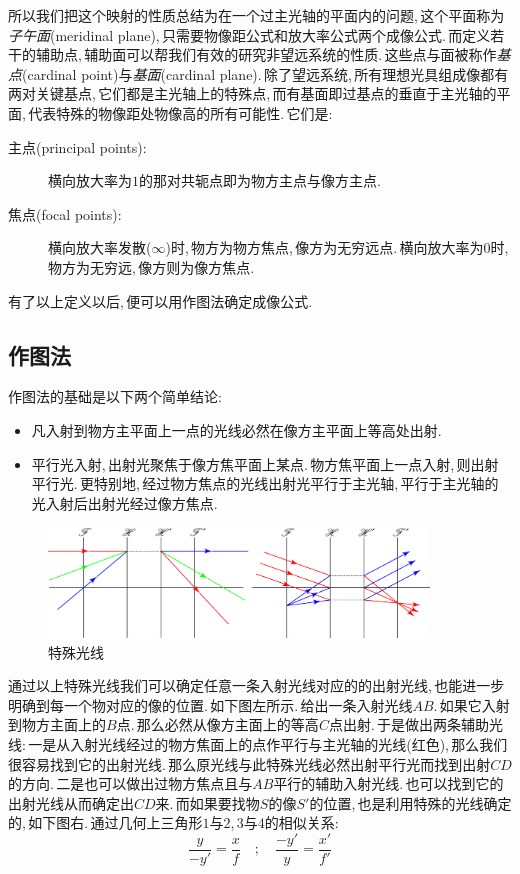 所以我们把这个映射的性质总结为在一个过主光轴的平面内的问题,\,这个平面称为\emph{子午面}(meridinal plane),\,只需要物像距公式和放大率公式两个成像公式.\,而定义若干的辅助点,\,辅助面可以帮我们有效的研究非望远系统的性质.\,这些点与面被称作\emph{基点}(cardinal point)与\emph{基面}(cardinal plane).\,除了望远系统,\,所有理想光具组成像都有两对关键基点,\,它们都是主光轴上的特殊点,\,而有基面即过基点的垂直于主光轴的平面,\,代表特殊的物像距处物像高的所有可能性.\,它们是:
\begin{description}
	\item[{\hei 主点(principal points)}:] 横向放大率为\(1\)的那对共轭点即为物方主点与像方主点.
	\item[{\hei 焦点(focal points)}:] 横向放大率发散(\(\infty\))时,\,物方为物方焦点,\,像方为无穷远点.\,横向放大率为\(0\)时,\,物方为无穷远,\,像方则为像方焦点.
\end{description}

有了以上定义以后,\,便可以用作图法确定成像公式.

\subsection{作图法}
作图法的基础是以下两个简单结论:
\begin{itemize}
	\item 凡入射到物方主平面上一点的光线必然在像方主平面上等高处出射.
	\item 平行光入射,\,出射光聚焦于像方焦平面上某点.\,物方焦平面上一点入射,\,则出射平行光.\,更特别地,\,经过物方焦点的光线出射光平行于主光轴,\,平行于主光轴的光入射后出射光经过像方焦点.
\end{itemize}
\begin{figure}[H]
\centering
\includegraphics[width=0.9\textwidth]{image/5-7-7.png}
\caption{特殊光线}
\end{figure}

通过以上特殊光线我们可以确定任意一条入射光线对应的的出射光线,\,也能进一步明确到每一个物对应的像的位置.\,如下图左所示.\,给出一条入射光线\(AB\).\,如果它入射到物方主面上的\(B\)点.\,那么必然从像方主面上的等高\(C\)点出射.\,于是做出两条辅助光线:\,一是从入射光线经过的物方焦面上的点作平行与主光轴的光线(红色),\,那么我们很容易找到它的出射光线.\,那么原光线与此特殊光线必然出射平行光而找到出射\(CD\)的方向.\,二是也可以做出过物方焦点且与\(AB\)平行的辅助入射光线.\,也可以找到它的出射光线从而确定出\(CD\)来.\,而如果要找物\(S\)的像\(S'\)的位置,\,也是利用特殊的光线确定的,\,如下图右.\,通过几何上三角形\(1\)与\(2\),\,\(3\)与\(4\)的相似关系:
\[\frac{y}{-y'}=\frac{x}{f}\quad ;\quad \frac{-y'}{y}=\frac{x'}{f'}\]

